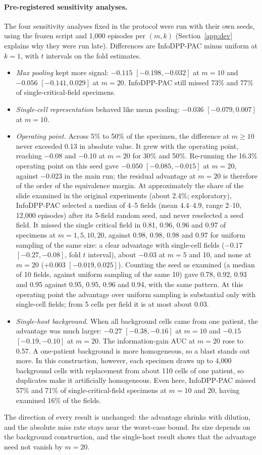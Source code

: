 \documentclass[11pt]{article}
\theoremstyle{remark}
\theoremstyle{definition}
\begin{document}
\paragraph{Pre-registered sensitivity analyses.} The four sensitivity analyses fixed in the protocol were run with their own seeds, using the frozen script and 1,000 episodes per $(m,k)$ (Section~\ref{app:dev} explains why they were run late). Differences are InfoDPP-PAC minus uniform at $k=1$, with $t$ intervals on the fold estimates.
\begin{itemize}
\item \emph{Max pooling} kept more signal: $-0.115$ $[-0.198,-0.032]$ at $m=10$ and $-0.056$ $[-0.141,0.029]$ at $m=20$. InfoDPP-PAC still missed 73\% and 77\% of single-critical-field specimens.
\item \emph{Single-cell representation} behaved like mean pooling: $-0.036$ $[-0.079,0.007]$ at $m=10$.
\item \emph{Operating point.} Across 5\% to 50\% of the specimen, the difference at $m\ge10$ never exceeded 0.13 in absolute value. It grew with the operating point, reaching $-0.08$ and $-0.10$ at $m=20$ for 30\% and 50\%. Re-running the 16.3\% operating point on this seed gave $-0.050$ $[-0.085,-0.015]$ at $m=20$, against $-0.023$ in the main run; the residual advantage at $m=20$ is therefore of the order of the equivalence margin. At approximately the share of the slide examined in the original experiments (about 2.4\%; exploratory), InfoDPP-PAC selected a median of 4--5 fields (mean 4.4--4.9, range 2--10, 12,000 episodes) after its 5-field random seed, and never reselected a seed field. It missed the single critical field in 0.81, 0.96, 0.96 and 0.97 of specimens at $m=1,5,10,20$, against 0.98, 0.98, 0.98 and 0.97 for uniform sampling of the same size: a clear advantage with single-cell fields ($-0.17$ $[-0.27,-0.08]$, fold $t$ interval), about $-0.03$ at $m=5$ and 10, and none at $m=20$ ($+0.003$ $[-0.019,0.025]$). Counting the seed as examined (a median of 10 fields, against uniform sampling of the same 10) gave 0.78, 0.92, 0.93 and 0.95 against 0.95, 0.95, 0.96 and 0.94, with the same pattern. At this operating point the advantage over uniform sampling is substantial only with single-cell fields; from 5 cells per field it is at most about 0.03.
\item \emph{Single-host background.} When all background cells came from one patient, the advantage was much larger: $-0.27$ $[-0.38,-0.16]$ at $m=10$ and $-0.15$ $[-0.19,-0.10]$ at $m=20$. The information-gain AUC at $m=20$ rose to 0.57. A one-patient background is more homogeneous, so a blast stands out more. In this construction, however, each specimen draws up to 4,000 background cells with replacement from about 110 cells of one patient, so duplicates make it artificially homogeneous. Even here, InfoDPP-PAC missed 57\% and 71\% of single-critical-field specimens at $m=10$ and 20, having examined 16\% of the fields.
\end{itemize}
The direction of every result is unchanged: the advantage shrinks with dilution, and the absolute miss rate stays near the worst-case bound. Its size depends on the background construction, and the single-host result shows that the advantage need not vanish by $m=20$.
\end{document}
